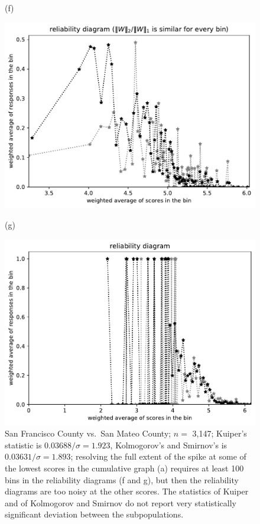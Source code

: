 \documentclass{article}
\newlength{\imsize}
\begin{document}
\begin{figure}
\begin{centering}
(f)
\parbox{\imsize}{\includegraphics[width=\imsize]
{../codes/weighted/County_of_San_Francisco_vs_San_Mateo-LNGI/equierrs100.pdf}}
\quad\quad
(g)
\parbox{\imsize}{\includegraphics[width=\imsize]
{../codes/weighted/County_of_San_Francisco_vs_San_Mateo-LNGI/equiscores100.pdf}}

\end{centering}
\caption{San Francisco County vs.\ San Mateo County; $n =$ 3,147;
         Kuiper's statistic is $0.03688 / \sigma = 1.923$,
         Kolmogorov's and Smirnov's is $0.03631 / \sigma = 1.893$;
         resolving the full extent of the spike
         at some of the lowest scores in the cumulative graph (a) requires
         at least 100 bins in the reliability diagrams (f and g),
         but then the reliability diagrams are too noisy at the other scores.
         The statistics of Kuiper and of Kolmogorov and Smirnov do not report
         very statistically significant deviation between the subpopulations.
}
\label{San_Francisco-San_Mateo}
\end{figure}
\end{document}
